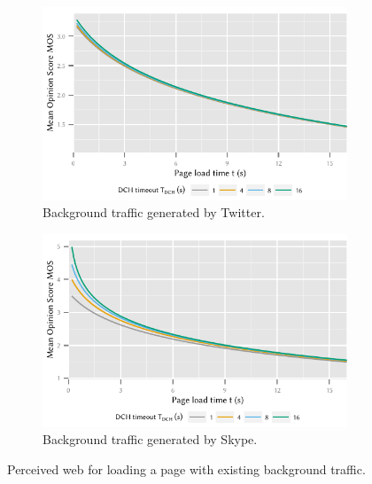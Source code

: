 \begin{figure}
	\begin{subfigure}[b]{\textwidth}
	\centering
	\includegraphics{network/network_traces/numerical_results/figures/qoe_with_backgroundapp_twitter}
	\caption{Background traffic generated by Twitter.}\label{fig:network:network_traces:numerical_results:web_qoe:twitter}
	\end{subfigure}

	\begin{subfigure}[b]{\textwidth}
	\centering
	\includegraphics{network/network_traces/numerical_results/figures/qoe_with_backgroundapp_skype}
	\caption{Background traffic generated by Skype.}\label{fig:network:network_traces:numerical_results:web_qoe:skype}
	\end{subfigure}

	\caption{Perceived web  for loading a page with existing background traffic.}\label{fig:network:network_traces:numerical_results:web_qoe}
\end{figure}

